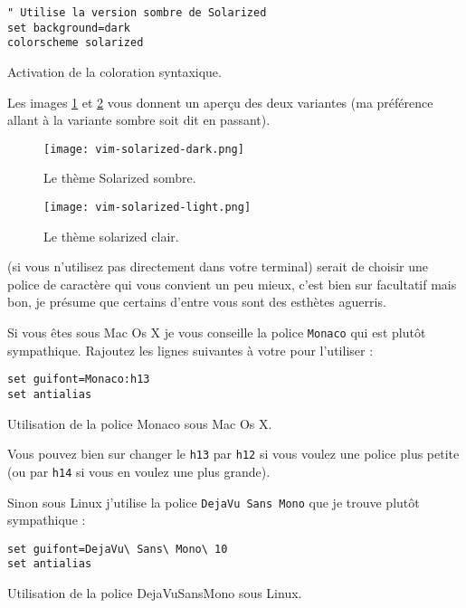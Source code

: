 \begin{listing}[H]
\begin{verbatim}
" Utilise la version sombre de Solarized
set background=dark
colorscheme solarized
\end{verbatim}
  \caption{Activation de la coloration syntaxique.}
  \label{lst:solarized}
\end{listing}

Les images \ref{fig:vim-solarized-dark} et \ref{fig:vim-solarized-light} vous donnent un aperçu des deux variantes (ma préférence allant à la variante sombre soit dit en passant).

\begin{figure}%
  \texttt{[image: vim-solarized-dark.png]}
  \caption{Le thème Solarized sombre.}
  \label{fig:vim-solarized-dark}
\end{figure}

\begin{figure}%
  \texttt{[image: vim-solarized-light.png]}
  \caption{Le thème solarized clair.}
  \label{fig:vim-solarized-light}
\end{figure}

 (si vous n'utilisez pas \vim directement dans votre terminal) serait de choisir une police de caractère qui vous convient un peu mieux, c'est bien sur facultatif mais bon, je présume que certains d'entre vous sont des esthètes aguerris.

Si vous êtes sous Mac Os X je vous conseille la police \Verb|Monaco| qui est plutôt sympathique. Rajoutez les lignes suivantes à votre \vimrc pour l'utiliser :

\begin{listing}[H]
\begin{verbatim}
set guifont=Monaco:h13
set antialias
\end{verbatim}
  \caption{Utilisation de la police Monaco sous Mac Os X.}
  \label{lst:monaco}
\end{listing}

Vous pouvez bien sur changer le \Verb|h13| par \Verb|h12| si vous voulez une police plus petite (ou par \Verb|h14| si vous en voulez une plus grande).

Sinon sous Linux j'utilise la police \Verb|DejaVu Sans Mono| que je trouve plutôt sympathique :

\begin{listing}[H]
\begin{verbatim}
set guifont=DejaVu\ Sans\ Mono\ 10
set antialias
\end{verbatim}
  \caption{Utilisation de la police DejaVuSansMono sous Linux.}
  \label{lst:dejavusansmono}
\end{listing}

